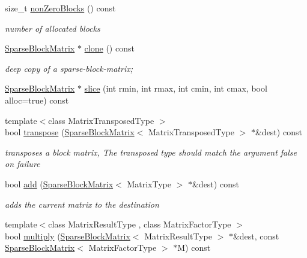 \begin{DoxyCompactItemize}
size\+\_\+t \hyperlink{classg2o_1_1SparseBlockMatrix_a4e2ecdfdec3b47b2f9373c56aecc7d15}{non\+Zero\+Blocks} () const 
\begin{DoxyCompactList}\small\item\em number of allocated blocks \end{DoxyCompactList}\item 
\hyperlink{classg2o_1_1SparseBlockMatrix}{Sparse\+Block\+Matrix} $\ast$ \hyperlink{classg2o_1_1SparseBlockMatrix_ac2946d6216dd2adfbd257b495a589d13}{clone} () const 
\begin{DoxyCompactList}\small\item\em deep copy of a sparse-\/block-\/matrix; \end{DoxyCompactList}\item 
\hyperlink{classg2o_1_1SparseBlockMatrix}{Sparse\+Block\+Matrix} $\ast$ \hyperlink{classg2o_1_1SparseBlockMatrix_abc8836f73757f69b97965459944043a5}{slice} (int rmin, int rmax, int cmin, int cmax, bool alloc=true) const 
\item 
{\footnotesize template$<$class Matrix\+Transposed\+Type $>$ }\\bool \hyperlink{classg2o_1_1SparseBlockMatrix_a85d0915bc613dac1a46d372fc1cacde7}{transpose} (\hyperlink{classg2o_1_1SparseBlockMatrix}{Sparse\+Block\+Matrix}$<$ Matrix\+Transposed\+Type $>$ $\ast$\&dest) const 
\begin{DoxyCompactList}\small\item\em transposes a block matrix, The transposed type should match the argument false on failure \end{DoxyCompactList}\item 
bool \hyperlink{classg2o_1_1SparseBlockMatrix_a47d026462af0a744cdba6cbf9caa0b3b}{add} (\hyperlink{classg2o_1_1SparseBlockMatrix}{Sparse\+Block\+Matrix}$<$ Matrix\+Type $>$ $\ast$\&dest) const 
\begin{DoxyCompactList}\small\item\em adds the current matrix to the destination \end{DoxyCompactList}\item 
{\footnotesize template$<$class Matrix\+Result\+Type , class Matrix\+Factor\+Type $>$ }\\bool \hyperlink{classg2o_1_1SparseBlockMatrix_a7e37bb74f265c78174fbb5ac9f4df131}{multiply} (\hyperlink{classg2o_1_1SparseBlockMatrix}{Sparse\+Block\+Matrix}$<$ Matrix\+Result\+Type $>$ $\ast$\&dest, const \hyperlink{classg2o_1_1SparseBlockMatrix}{Sparse\+Block\+Matrix}$<$ Matrix\+Factor\+Type $>$ $\ast$M) const 

\end{DoxyCompactItemize}
